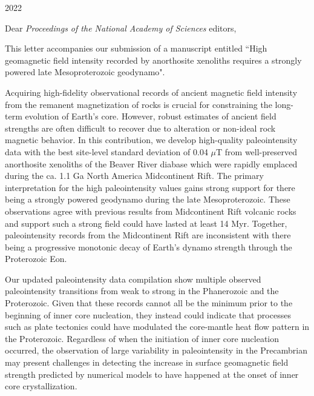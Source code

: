 \documentclass[11pt, letterpaper]{article}
\begin{document}
\begin{flushleft}
 
\hfill 2022

Dear \textit{Proceedings of the National Academy of Sciences} editors,

 This letter accompanies our submission of a manuscript entitled ``High geomagnetic field intensity recorded by anorthosite xenoliths requires a strongly powered late Mesoproterozoic geodynamo". 
 
 Acquiring high-fidelity observational records of ancient magnetic field intensity from the remanent magnetization of rocks is crucial for constraining the long-term evolution of Earth's core. However, robust estimates of ancient field strengths are often difficult to recover due to alteration or non-ideal rock magnetic behavior. In this contribution, we develop high-quality paleointensity data with the best site-level standard deviation of 0.04 $\mu$T from well-preserved anorthosite xenoliths of the Beaver River diabase which were rapidly emplaced during the ca. 1.1 Ga North America Midcontinent Rift. The primary interpretation for the high paleointensity values gains strong support for there being a strongly powered geodynamo during the late Mesoproterozoic. These observations agree with previous results from Midcontinent Rift volcanic rocks and support such a strong field could have lasted at least 14 Myr. Together, paleointensity records from the Midcontinent Rift are inconsistent with there being a progressive monotonic decay of Earth's dynamo strength through the Proterozoic Eon.
 
  Our updated paleointensity data compilation show multiple observed paleointensity transitions from weak to strong in the Phanerozoic and the Proterozoic. Given that these records cannot all be the minimum prior to the beginning of inner core nucleation, they instead could indicate that processes such as plate tectonics could have modulated the core-mantle heat flow pattern in the Proterozoic. Regardless of when the initiation of inner core nucleation occurred, the observation of large variability in paleointensity in the Precambrian may present challenges in detecting the increase in surface geomagnetic field strength predicted by numerical models to have happened at the onset of inner core crystallization. 
 

\end{flushleft}
\end{document}
